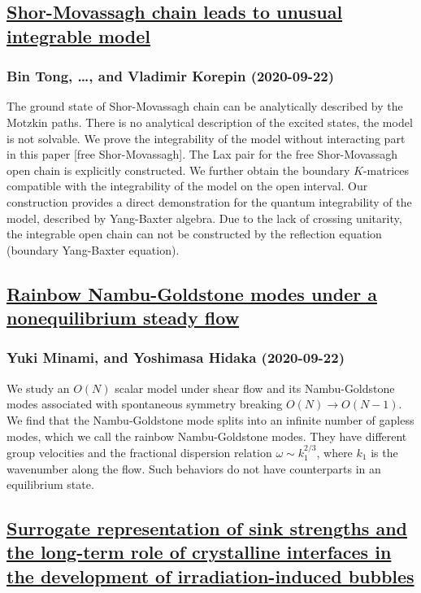 {\subsection*{\href{http://arxiv.org/abs/2009.10368v1}{Shor-Movassagh chain leads to unusual integrable model}}
\subsubsection*{Bin Tong, \dots, and Vladimir Korepin (2020-09-22)}
The ground state of Shor-Movassagh chain can be analytically described by the
Motzkin paths. There is no analytical description of the excited states, the
model is not solvable. We prove the integrability of the model without
interacting part in this paper [free Shor-Movassagh]. The Lax pair for the free
Shor-Movassagh open chain is explicitly constructed. We further obtain the
boundary $K$-matrices compatible with the integrability of the model on the
open interval. Our construction provides a direct demonstration for the quantum
integrability of the model, described by Yang-Baxter algebra. Due to the lack
of crossing unitarity, the integrable open chain can not be constructed by the
reflection equation (boundary Yang-Baxter equation).

\subsection*{\href{http://arxiv.org/abs/2009.10357v1}{Rainbow Nambu-Goldstone modes under a nonequilibrium steady flow}}
\subsubsection*{Yuki Minami, and Yoshimasa Hidaka (2020-09-22)}
We study an $O(N)$ scalar model under shear flow and its Nambu-Goldstone
modes associated with spontaneous symmetry breaking $O(N) \to O(N-1)$. We find
that the Nambu-Goldstone mode splits into an infinite number of gapless modes,
which we call the rainbow Nambu-Goldstone modes. They have different group
velocities and the fractional dispersion relation $\omega \sim k_1^{2/3}$,
where $k_1$ is the wavenumber along the flow. Such behaviors do not have
counterparts in an equilibrium state.

\subsection*{\href{http://arxiv.org/abs/2009.10344v1}{Surrogate representation of sink strengths and the long-term role of  crystalline interfaces in the development of irradiation-induced bubbles}}
}
